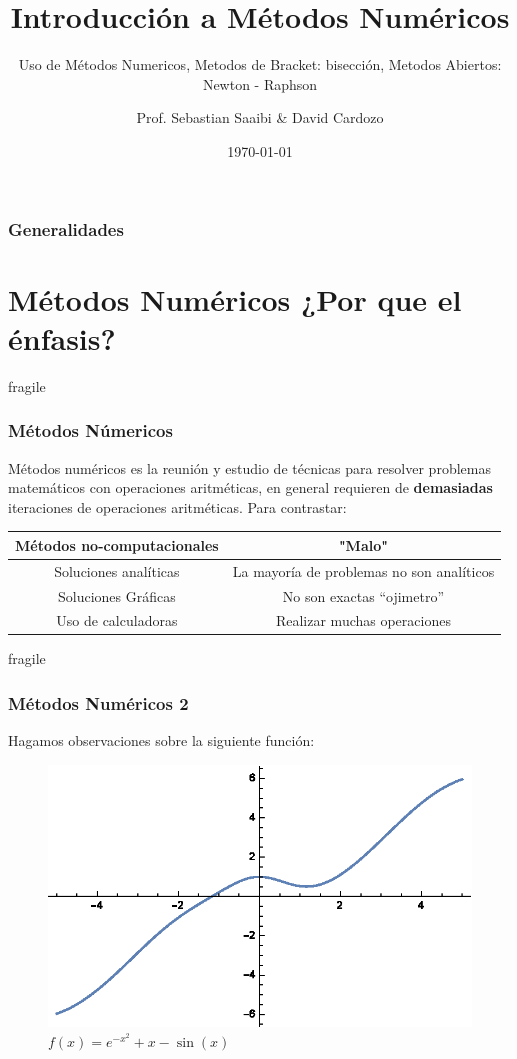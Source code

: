 \documentclass{beamer}
\author{Prof. Sebastian Saaibi \& David Cardozo\inst{1}}
\title{Introducción a Métodos Numéricos  }
\subtitle{Uso de Métodos Numericos, Metodos de Bracket: bisección, Metodos Abiertos: Newton - Raphson} %
\institute[Universidad de los Andes]
{
	\inst{1}%
	Física   \\
	Lectura $8$ Herramientas Computacionales \\
	Universidad de los Andes
}
\date{\today} %
\begin{document}
\maketitle
\begin{frame}
	\frametitle{Generalidades}
	\tableofcontents
\end{frame}


\section{Métodos Numéricos ¿Por que el énfasis?  }

\begin{frame}{fragile}
	\frametitle{Métodos Númericos}
	
	Métodos numéricos es la reunión y estudio de técnicas para resolver problemas matemáticos con operaciones aritméticas, en general requieren de \textbf{demasiadas} iteraciones de operaciones aritméticas.
	\vspace{1cm}
	Para contrastar:
	\begin{tabular}{|c|c|}
		\hline Métodos no-computacionales & "Malo" \\ 
		\hline Soluciones analíticas & La mayoría de problemas no son analíticos \\ 
		\hline Soluciones Gráficas  & No son exactas ``ojimetro'' \\ 
		\hline  Uso de calculadoras & Realizar muchas operaciones  \\ 
		\hline 
	\end{tabular}  
	
\end{frame}

\begin{frame}{fragile}
	\frametitle{Métodos Numéricos 2}
	Hagamos observaciones sobre la siguiente función: 
	\begin{figure}
		\includegraphics{Graph1}
		\caption{$ f(x) =  e^{-x^2} + x - \sin(x)$ }
	\end{figure}
	
\end{frame}
\end{document}
